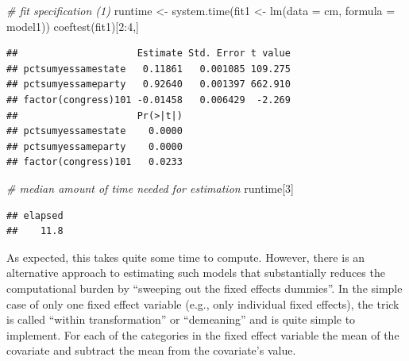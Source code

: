 \documentclass[
  12pt,
]{style/krantz}
\newenvironment{Shaded}{\begin{snugshade}}{\end{snugshade}}
\newcommand{\AttributeTok}[1]{\textcolor[rgb]{0.77,0.63,0.00}{#1}}
\newcommand{\CommentTok}[1]{\textcolor[rgb]{0.56,0.35,0.01}{\textit{#1}}}
\newcommand{\DecValTok}[1]{\textcolor[rgb]{0.00,0.00,0.81}{#1}}
\newcommand{\FunctionTok}[1]{\textcolor[rgb]{0.00,0.00,0.00}{#1}}
\newcommand{\NormalTok}[1]{#1}
\newcommand{\OtherTok}[1]{\textcolor[rgb]{0.56,0.35,0.01}{#1}}
\newcommand{\SpecialCharTok}[1]{\textcolor[rgb]{0.00,0.00,0.00}{#1}}
\begin{document}
\begin{Shaded}
\begin{Highlighting}[]
\CommentTok{\# fit specification (1)}
\NormalTok{runtime }\OtherTok{\textless{}{-}} \FunctionTok{system.time}\NormalTok{(fit1 }\OtherTok{\textless{}{-}} \FunctionTok{lm}\NormalTok{(}\AttributeTok{data =}\NormalTok{ cm, }\AttributeTok{formula =}\NormalTok{ model1))}
\FunctionTok{coeftest}\NormalTok{(fit1)[}\DecValTok{2}\SpecialCharTok{:}\DecValTok{4}\NormalTok{,]}
\end{Highlighting}
\end{Shaded}

\begin{verbatim}
##                     Estimate Std. Error t value
## pctsumyessamestate   0.11861   0.001085 109.275
## pctsumyessameparty   0.92640   0.001397 662.910
## factor(congress)101 -0.01458   0.006429  -2.269
##                     Pr(>|t|)
## pctsumyessamestate    0.0000
## pctsumyessameparty    0.0000
## factor(congress)101   0.0233
\end{verbatim}

\begin{Shaded}
\begin{Highlighting}[]
\CommentTok{\# median amount of time needed for estimation}
\NormalTok{runtime[}\DecValTok{3}\NormalTok{]}
\end{Highlighting}
\end{Shaded}

\begin{verbatim}
## elapsed 
##    11.8
\end{verbatim}

As expected, this takes quite some time to compute. However, there is an alternative approach to estimating such models that substantially reduces the computational burden by ``sweeping out the fixed effects dummies''. In the simple case of only one fixed effect variable (e.g., only individual fixed effects), the trick is called ``within transformation'' or ``demeaning'' and is quite simple to implement. For each of the categories in the fixed effect variable the mean of the covariate and subtract the mean from the covariate's value.
\end{document}
